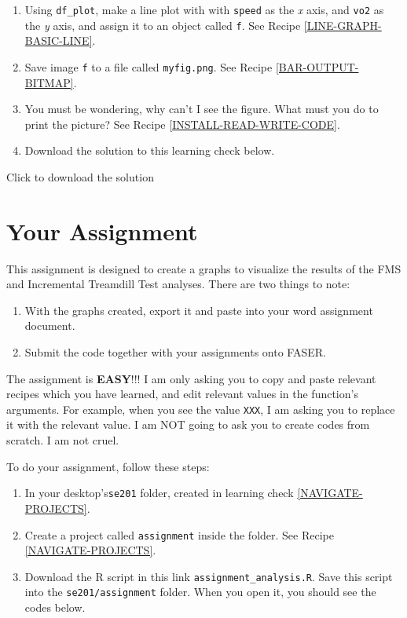 \documentclass[
]{book}
\begin{document}
\begin{enumerate}
\item
  Using \texttt{df\_plot}, make a line plot with with \texttt{speed} as the \emph{x} axis, and \texttt{vo2} as the \emph{y} axis, and assign it to an object called \texttt{f}. See Recipe \ref{LINE-GRAPH-BASIC-LINE}.
\item
  Save image \texttt{f} to a file called \texttt{myfig.png}. See Recipe \ref{BAR-OUTPUT-BITMAP}.
\item
  You must be wondering, why can't I see the figure. What must you do to print the picture? See Recipe \ref{INSTALL-READ-WRITE-CODE}.
\item
  Download the solution to this learning check below.
\end{enumerate}

Click to download the solution

\hypertarget{your-assignment}{%
\chapter{Your Assignment}\label{your-assignment}}

This assignment is designed to create a graphs to visualize the results of the FMS and Incremental Treamdill Test analyses. There are two things to note:

\begin{enumerate}
\def\labelenumi{\arabic{enumi}.}
\item
  With the graphs created, export it and paste into your word assignment document.
\item
  Submit the code together with your assignments onto FASER.
\end{enumerate}

The assignment is \textbf{EASY}!!! I am only asking you to copy and paste relevant recipes which you have learned, and edit relevant values in the function's arguments. For example, when you see the value \texttt{XXX}, I am asking you to replace it with the relevant value. I am NOT going to ask you to create codes from scratch. I am not cruel.

To do your assignment, follow these steps:

\begin{enumerate}
\def\labelenumi{\arabic{enumi}.}
\item
  In your desktop's\texttt{se201} folder, created in learning check \ref{NAVIGATE-PROJECTS}.
\item
  Create a project called \texttt{assignment} inside the folder. See Recipe \ref{NAVIGATE-PROJECTS}.
\item
  Download the R script in this link \texttt{assignment\_analysis.R}. Save this script into the \texttt{se201/assignment} folder. When you open it, you should see the codes below.
\end{enumerate}
\end{document}
